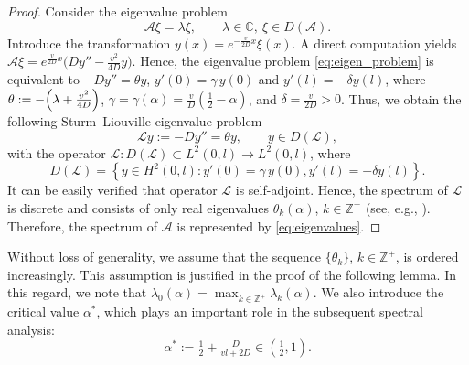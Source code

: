 \documentclass{mpi2015-cscpreprint}
\numberwithin{equation}{section}
\begin{document}
\begin{proof}
Consider the eigenvalue problem
\begin{equation}\label{eq:eigen_problem}
\mathcal{A}\xi=\lambda\xi,\qquad \lambda\in\mathbb{C},\ \xi\in D(\mathcal{A}).
\end{equation}
Introduce the transformation $y(x)=e^{-\frac{v}{2D}x}\xi(x)$. A direct computation yields $\mathcal{A}\xi = e^{\frac{v}{2D}x}\bigl(D y'' - \frac{v^2}{4D} y\bigr)$.
Hence, the eigenvalue problem \eqref{eq:eigen_problem} is equivalent to
$-D y'' = \theta y$, $y'(0)=\gamma\,y(0)$ 
and
$y'(l)=-\delta y(l)$,
where $\theta := -\Bigl(\lambda + \frac{v^2}{4D}\Bigr)$, $\gamma=\gamma(\alpha)=\frac{v}{D}\left(\frac12-\alpha\right)$, and $\delta=\frac{v}{2D}>0$.
Thus, we obtain the following Sturm--Liouville eigenvalue problem
\begin{equation}\label{eq:operator_L}
\mathcal{L}y:=- D y'' = \theta y, \qquad y\in D(\mathcal{L}),
\end{equation}
with the operator $\mathcal{L}:D(\mathcal{L})\subset L^2(0,l)\to L^2(0,l)$, where $$D(\mathcal{L})=\left\{y\in H^2(0,l):y'(0)=\gamma\,y(0), y'(l)=-\delta y(l)\right\}.$$ It can be easily verified that operator $\mathcal{L}$ is self-adjoint. Hence, the spectrum of $\mathcal{L}$ is discrete and consists of only real eigenvalues $\theta_k(\alpha)$, $k\in\mathbb{Z}^+$ (see, e.g., \cite[Section XII.2]{DunSch1988}). Therefore, the spectrum of $\mathcal{A}$ is represented by \eqref{eq:eigenvalues}.
\end{proof}

Without loss of generality, we assume that the sequence $\{\theta_k\}$, ${k\in\mathbb{Z}^+}$, is ordered increasingly. This assumption is justified in the proof of the following lemma. In this regard, we note that
$\lambda_0(\alpha)=\max_{k\in\mathbb{Z}^+}\lambda_k(\alpha)$.
We also introduce the critical value $\alpha^*$, which plays an important role in the subsequent spectral analysis:
\begin{equation}\label{eq:alpha*}
\alpha^*:=\tfrac{1}{2}+\tfrac{D}{vl+2D}\in\left(\tfrac{1}{2},1\right).   
\end{equation}
\end{document}
